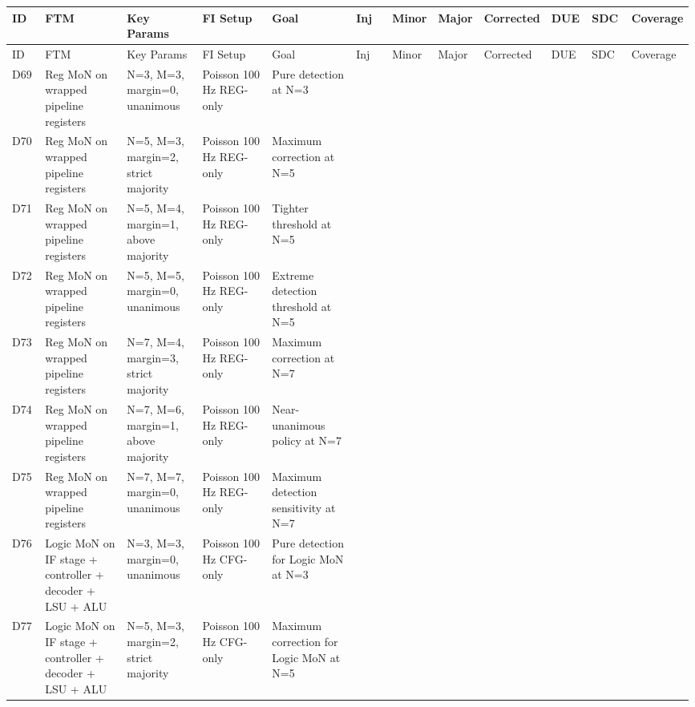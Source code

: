 \begin{longtable}{|p{0.05\linewidth}|p{0.14\linewidth}|p{0.12\linewidth}|p{0.12\linewidth}|p{0.14\linewidth}|p{0.06\linewidth}|p{0.06\linewidth}|p{0.06\linewidth}|p{0.06\linewidth}|p{0.06\linewidth}|p{0.06\linewidth}|p{0.06\linewidth}|}
\hline
ID & FTM & Key Params & FI Setup & Goal & Inj & Minor & Major & Corrected & DUE & SDC & Coverage \\
\hline
\endfirsthead
\hline
ID & FTM & Key Params & FI Setup & Goal & Inj & Minor & Major & Corrected & DUE & SDC & Coverage \\
\hline
\endhead
D69 & Reg MoN on wrapped pipeline registers & N=3, M=3, margin=0, unanimous & Poisson 100 Hz \textbar{} REG-only & Pure detection at N=3 &  &  &  &  &  &  &  \\
\hline
D70 & Reg MoN on wrapped pipeline registers & N=5, M=3, margin=2, strict majority & Poisson 100 Hz \textbar{} REG-only & Maximum correction at N=5 &  &  &  &  &  &  &  \\
\hline
D71 & Reg MoN on wrapped pipeline registers & N=5, M=4, margin=1, above majority & Poisson 100 Hz \textbar{} REG-only & Tighter threshold at N=5 &  &  &  &  &  &  &  \\
\hline
D72 & Reg MoN on wrapped pipeline registers & N=5, M=5, margin=0, unanimous & Poisson 100 Hz \textbar{} REG-only & Extreme detection threshold at N=5 &  &  &  &  &  &  &  \\
\hline
D73 & Reg MoN on wrapped pipeline registers & N=7, M=4, margin=3, strict majority & Poisson 100 Hz \textbar{} REG-only & Maximum correction at N=7 &  &  &  &  &  &  &  \\
\hline
D74 & Reg MoN on wrapped pipeline registers & N=7, M=6, margin=1, above majority & Poisson 100 Hz \textbar{} REG-only & Near-unanimous policy at N=7 &  &  &  &  &  &  &  \\
\hline
D75 & Reg MoN on wrapped pipeline registers & N=7, M=7, margin=0, unanimous & Poisson 100 Hz \textbar{} REG-only & Maximum detection sensitivity at N=7 &  &  &  &  &  &  &  \\
\hline
D76 & Logic MoN on IF stage + controller + decoder + LSU + ALU & N=3, M=3, margin=0, unanimous & Poisson 100 Hz \textbar{} CFG-only & Pure detection for Logic MoN at N=3 &  &  &  &  &  &  &  \\
\hline
D77 & Logic MoN on IF stage + controller + decoder + LSU + ALU & N=5, M=3, margin=2, strict majority & Poisson 100 Hz \textbar{} CFG-only & Maximum correction for Logic MoN at N=5 &  &  &  &  &  &  &  \\

\end{longtable}
